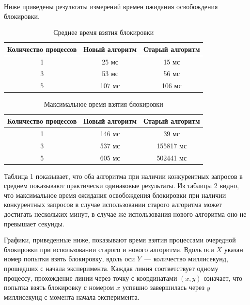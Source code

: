 Ниже приведены результаты измерений времен ожидания освобождения блокировки.

\begin{table}[H]
\caption{\label{tab:summary}Среднее время взятия блокировки}
\begin{center}
\begin{tabular}{|c|c|c|}
\hline
Количество процессов & Новый алгоритм & Старый алгоритм \\
\hline
1 & 25 мс & 15 мс \\
\hline
3 & 53 мс & 56 мс \\
\hline
5 & 107 мс & 106 мс \\
\hline
\end{tabular}
\end{center}

\end{table} \begin{table}[H]
\caption{\label{tab:summary}Максимальное время взятия блокировки}
\begin{center}
\begin{tabular}{|c|c|c|}
\hline
Количество процессов & Новый алгоритм & Старый алгоритм \\
\hline
1 & 146 мс & 39 мс \\
\hline
3 & 537 мс & 155817 мс \\
\hline
5 & 605 мс & 502441 мс \\
\hline
\end{tabular}
\end{center}
\end{table} 

Таблица 1 показывает, что оба алгоритма при наличии конкурентных запросов в среднем показывают практически одинаковые результаты.
Из таблицы 2 видно, что максимальное время ожидания освобождения блокировки при наличии конкурентных запросов в случае использовании старого алгоритма может достигать нескольких минут, в случае же использования нового алгоритма оно не превышает секунды.

Графики, приведенные ниже, показывают время взятия процессами очередной блокировки при использовании старого и нового алгоритма. Вдоль оси $X$ указан номер попытки взять блокировку, вдоль оси $Y$~--- количество миллисекунд, прошедших с начала эксперимента. Каждая линия соответствует одному процессу, прохождение линии через точку с координатами $(x, y)$ означает, что попытка взять блокировку с номером $x$ успешно завершилась через $y$ миллисекунд с момента начала эксперимента.

